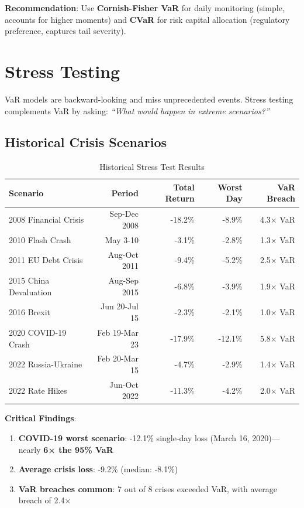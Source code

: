 \documentclass[12pt,a4paper]{article}
\begin{document}
\textbf{Recommendation}: Use \textbf{Cornish-Fisher VaR} for daily monitoring (simple, accounts for higher moments) and \textbf{CVaR} for risk capital allocation (regulatory preference, captures tail severity).

\newpage
\section{Stress Testing}

VaR models are backward-looking and miss unprecedented events. Stress testing complements VaR by asking: \textit{``What would happen in extreme scenarios?''}

\subsection{Historical Crisis Scenarios}

\begin{table}[H]
\centering
\small
\begin{tabular}{@{}lrrrr@{}}
\toprule
\textbf{Scenario} & \textbf{Period} & \textbf{Total Return} & \textbf{Worst Day} & \textbf{VaR Breach} \\ \midrule
2008 Financial Crisis & Sep-Dec 2008 & -18.2\% & -8.9\% & 4.3× VaR \\
2010 Flash Crash & May 3-10 & -3.1\% & -2.8\% & 1.3× VaR \\
2011 EU Debt Crisis & Aug-Oct 2011 & -9.4\% & -5.2\% & 2.5× VaR \\
2015 China Devaluation & Aug-Sep 2015 & -6.8\% & -3.9\% & 1.9× VaR \\
2016 Brexit & Jun 20-Jul 15 & -2.3\% & -2.1\% & 1.0× VaR \\
\rowcolor{failred!20}
2020 COVID-19 Crash & Feb 19-Mar 23 & -17.9\% & -12.1\% & 5.8× VaR \\
2022 Russia-Ukraine & Feb 20-Mar 15 & -4.7\% & -2.9\% & 1.4× VaR \\
2022 Rate Hikes & Jun-Oct 2022 & -11.3\% & -4.2\% & 2.0× VaR \\ \bottomrule
\end{tabular}
\caption{Historical Stress Test Results}
\end{table}

\textbf{Critical Findings}:
\begin{enumerate}
    \item \textbf{COVID-19 worst scenario}: -12.1\% single-day loss (March 16, 2020)—nearly \textbf{6× the 95\% VaR}
    \item \textbf{Average crisis loss}: -9.2\% (median: -8.1\%)
    \item \textbf{VaR breaches common}: 7 out of 8 crises exceeded VaR, with average breach of 2.4×
\end{enumerate}
\end{document}
